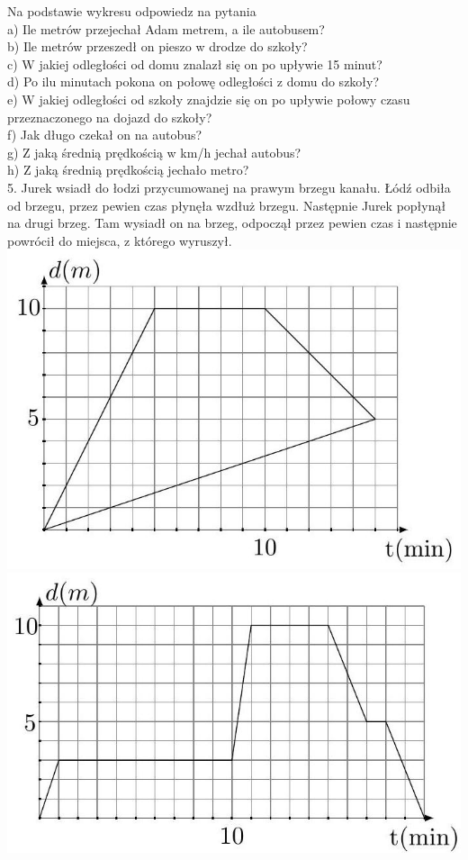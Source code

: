 \documentclass[10pt]{article}
\begin{document}
Na podstawie wykresu odpowiedz na pytania\\
a) Ile metrów przejechał Adam metrem, a ile autobusem?\\
b) Ile metrów przeszedł on pieszo w drodze do szkoły?\\
c) W jakiej odległości od domu znalazł się on po upływie 15 minut?\\
d) Po ilu minutach pokona on połowę odległości z domu do szkoły?\\
e) W jakiej odległości od szkoły znajdzie się on po upływie połowy czasu przeznaczonego na dojazd do szkoły?\\
f) Jak długo czekał on na autobus?\\
g) Z jaką średnią prędkością w km/h jechał autobus?\\
h) Z jaką średnią prędkością jechało metro?\\
5. Jurek wsiadł do łodzi przycumowanej na prawym brzegu kanału. Łódź odbiła od brzegu, przez pewien czas płynęła wzdłuż brzegu. Następnie Jurek popłynął na drugi brzeg. Tam wysiadł on na brzeg, odpoczął przez pewien czas i następnie powrócił do miejsca, z którego wyruszył.\\
\includegraphics[max width=\textwidth, center]{2024_11_21_e9b4faa005d5be2cc318g-120}\\
\includegraphics[max width=\textwidth, center]{2024_11_21_e9b4faa005d5be2cc318g-120(1)}\\
\end{document}
